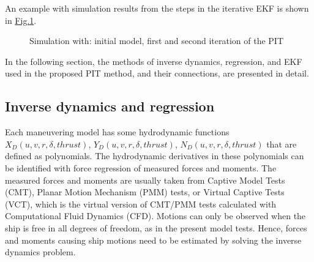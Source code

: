 \documentclass[review]{elsarticle}
\begin{document}
  
An example with simulation results from the steps in the iterative EKF is shown in \hyperref[\detokenize{01.01_method:iterations}]{Fig.\@ \ref{\detokenize{01.01_method:iterations}}}.

\begin{figure}[H]
\centering
\capstart

\noindent{}
\caption{Simulation with: initial model, first and second iteration of the PIT}\label{\detokenize{01.01_method:iterations}}\end{figure}

  
In the following section, the methods of inverse dynamics, regression, and EKF used in the proposed PIT method, and their connections, are presented in detail.


\subsection{Inverse dynamics and regression}
\label{\detokenize{03.01_inverse_dynamics:inverse-dynamics-and-regression}}\label{\detokenize{03.01_inverse_dynamics::doc}}
  
Each maneuvering model has some hydrodynamic functions \(X_D(u,v,r,\delta,thrust)\), \(Y_D(u,v,r,\delta,thrust)\), \(N_D(u,v,r,\delta,thrust)\) that are defined as polynomials. The hydrodynamic derivatives in these polynomials can be identified with force regression of measured forces and moments. The measured forces and moments are usually taken from Captive Model Tests (CMT), Planar Motion Mechanism (PMM) tests, or Virtual Captive Tests (VCT), which is the virtual version of CMT/PMM tests calculated with Computational Fluid Dynamics (CFD). Motions can only be observed when the ship is free in all degrees of freedom, as in the present model tests. Hence, forces and moments causing ship motions need to be estimated by solving the inverse dynamics problem.
\end{document}
